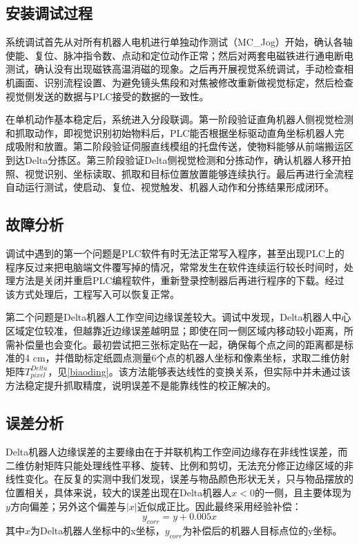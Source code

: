 \documentclass[UTF8,a4paper,12pt,fontset=windows]{ctexart}
\begin{document}
\subsection{安装调试过程}

系统调试首先从对所有机器人电机进行单独动作测试（MC\_Jog）开始，确认各轴使能、复位、脉冲指令数、点动和定位动作正常；然后对两套电磁铁进行通电断电测试，确认没有出现磁铁高温消磁的现象。之后再开展视觉系统调试，手动检查相机画面、识别流程设置、为避免镜头焦段和对焦被修改重新做视觉标定，然后检查视觉侧发送的数据与PLC接受的数据的一致性。

在单机动作基本稳定后，系统进入分段联调。第一阶段验证直角机器人侧视觉检测和抓取动作，即视觉识别初始物料后，PLC能否根据坐标驱动直角坐标机器人完成吸附和放置。第二阶段验证伺服直线模组的托盘传送，使物料能够从前端搬运区到达Delta分拣区。第三阶段验证Delta侧视觉检测和分拣动作，确认机器人移开拍照、视觉识别、坐标读取、抓取和目标位置放置能够连续执行。最后再进行全流程自动运行测试，使启动、复位、视觉触发、机器人动作和分拣结果形成闭环。

\subsection{故障分析}

调试中遇到的第一个问题是PLC软件有时无法正常写入程序，甚至出现PLC上的程序反过来把电脑端文件覆写掉的情况，常常发生在软件连续运行较长时间时，处理方法是关闭并重启PLC编程软件，重新登录控制器后再进行程序的下载。经过该方式处理后，工程写入可以恢复正常。

第二个问题是Delta机器人工作空间边缘误差较大。调试中发现，Delta机器人中心区域定位较准，但越靠近边缘误差越明显；即使在同一侧区域内移动较小距离，所需补偿量也会变化。最初尝试把三张标定贴在一起，确保每个点之间的距离都是标准的4 cm，并借助标定纸圆点测量6个点的机器人坐标和像素坐标，求取二维仿射矩阵$T^{Delta}_{pixel}$，见\eqref{biaoding}。该方法能够表达线性的变换关系，但实际中并未通过该方法稳定提升抓取精度，说明误差不是能靠线性的校正解决的。

\subsection{误差分析}

Delta机器人边缘误差的主要缘由在于并联机构工作空间边缘存在非线性误差，而二维仿射矩阵只能处理线性平移、旋转、比例和剪切，无法充分修正边缘区域的非线性变化。在反复的实测中我们发现，误差与物品颜色形状无关，只与物品摆放的位置相关，具体来说，较大的误差出现在Delta机器人$x<0$的一侧，且主要体现为$y$方向偏差；另外这个偏差与$|x|$近似成正比。因此最终采用经验补偿：
\[
y_{corr}=y+0.005x
\]
其中$x$为Delta机器人坐标中的x坐标，$y_{corr}$为补偿后的机器人目标点位的y坐标。
\end{document}
